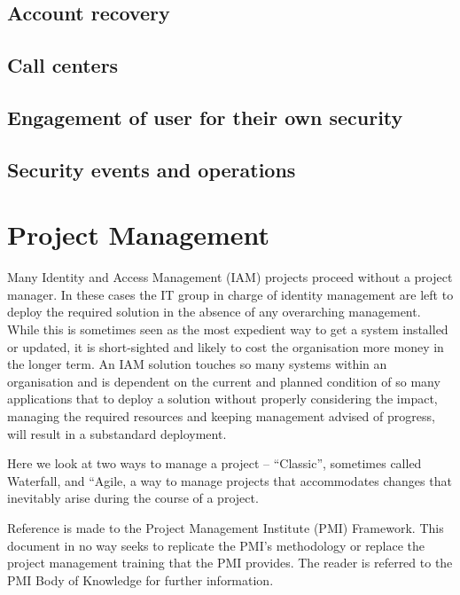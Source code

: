 \hypertarget{account-recovery}{%
\section{Account recovery}\label{account-recovery}}

\hypertarget{call-centers}{%
\section{Call centers}\label{call-centers}}

\hypertarget{engagement-of-user-for-their-own-security}{%
\section{Engagement of user for their own
security}\label{engagement-of-user-for-their-own-security}}

\hypertarget{security-events-and-operations}{%
\section{Security events and
operations}\label{security-events-and-operations}}

\hypertarget{project-management}{%
\chapter{Project Management}\label{project-management}}

Many Identity and Access Management (IAM) projects proceed without a
project manager. In these cases the IT group in charge of identity
management are left to deploy the required solution in the absence of
any overarching management. While this is sometimes seen as the most
expedient way to get a system installed or updated, it is short-sighted
and likely to cost the organisation more money in the longer term. An
IAM solution touches so many systems within an organisation and is
dependent on the current and planned condition of so many applications
that to deploy a solution without properly considering the impact,
managing the required resources and keeping management advised of
progress, will result in a substandard deployment.

Here we look at two ways to manage a project -- ``Classic'', sometimes
called Waterfall, and ``Agile, a way to manage projects that
accommodates changes that inevitably arise during the course of a
project.

Reference is made to the Project Management Institute (PMI) Framework.
This document in no way seeks to replicate the PMI's methodology or
replace the project management training that the PMI provides. The
reader is referred to the PMI Body of Knowledge for further information.

